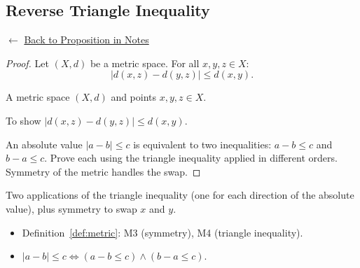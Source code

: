 
\subsection*{Reverse Triangle Inequality}
\label{prf:reverse-triangle}

\begin{remark*}[Return]
$\leftarrow$ \hyperref[prop:reverse-triangle]{Back to Proposition in Notes}
\end{remark*}

\begin{proof}
\Claim Let $(X,d)$ be a metric space. For all $x, y, z \in X$:
\[
|d(x,z) - d(y,z)| \le d(x,y).
\]

\Given A metric space $(X,d)$ and points $x, y, z \in X$.

\Goal To show $|d(x,z) - d(y,z)| \le d(x,y)$.

\Strategy An absolute value $|a - b| \le c$ is equivalent to two inequalities:
$a - b \le c$ and $b - a \le c$. Prove each using the triangle inequality
applied in different orders. Symmetry of the metric handles the swap.


\end{proof}

\begin{remark*}
Two applications of the triangle inequality (one for each direction of the
absolute value), plus symmetry to swap $x$ and $y$.
\end{remark*}

\begin{remark*}[Dependencies]
\begin{itemize}
  \item Definition~\ref{def:metric}: M3 (symmetry), M4 (triangle inequality).
  \item $|a - b| \le c \iff (a - b \le c) \land (b - a \le c)$.
\end{itemize}
\end{remark*}
